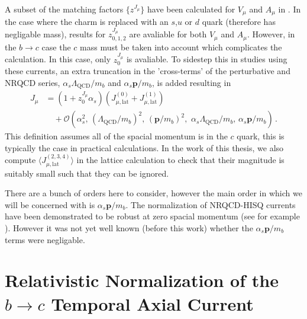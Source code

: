 A subset of the matching factors $\{z^{J_{\mu}}\}$ have been calculated for $V_{\mu}$ and $A_{\mu}$ in \cite{Monahan:2012dq}. In the case where the charm is replaced with an $s$,$u$ or $d$ quark (therefore has negligable mass), results for $z^{J_{\mu}}_{0,1,2}$ are avaliable for both $V_{\mu}$ and $A_{\mu}$. However, in the $b\to c$ case the $c$ mass must be taken into account which complicates the calculation. In this case, only $z^{J_{\mu}}_{0}$ is avaliable. To sidestep this in studies using these currents, an extra truncation in the 'cross-terms' of the perturbative and NRQCD series, $\alpha_s \Lambda_{\text{QCD}}/m_b$ and $\alpha_s {\textbf{p}}/m_b$, is added resulting in
\begin{align}
  \label{eq:nrqcd-hisq-current-truncate}
  J_{\mu} &= ( 1 + z^{J_{\mu}}_0 \alpha_s )( J_{\mu,\text{lat}}^{(0)} + J_{\mu,\text{lat}}^{(1)} ) \\ \nonumber &\quad + \mathcal{O}(\alpha_s^2,\, (\Lambda_{\text{QCD}}/m_b)^2,\, ({\textbf{p}}/m_b)^2,\,\, \alpha_s \Lambda_{\text{QCD}} / m_b, \, \alpha_s {\textbf{p}}/m_b )\,.
\end{align}
This definition assumes all of the spacial momentum is in the $c$ quark, this is typically the case in practical calculations. In the work of this thesis, we also compute $\langle J_{\mu,\text{lat}}^{(2,3,4)}\rangle$ in the lattice calculation to check that their magnitude is suitably small such that they can be ignored.

There are a bunch of orders here to consider, however the main order in which we will be concerned with is $\alpha_s{\textbf{p}}/m_b$. The normalization of NRQCD-HISQ currents have been demonstrated to be robust at zero spacial momentum (see for example \cite{Hughes:2017spc}). However it was not yet well known (before this work) whether the $\alpha_s{\textbf{p}}/m_b$ terms were negligable.

\section{Relativistic Normalization of the $b\to c$ Temporal Axial Current}
\label{sec:relativistic}

